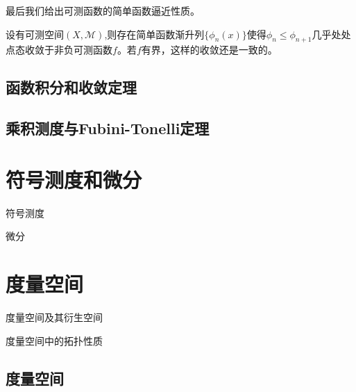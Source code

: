 \documentclass[lang=cn,10pt]{elegantbook}
\begin{document}
	最后我们给出可测函数的简单函数逼近性质。
	\begin{theorem}[可测函数的简单函数逼近]
		设有可测空间\((X,\mathcal{M})\),则存在简单函数渐升列\(\{\phi_n(x)\}\)使得\(\phi_n\le\phi_{n+1}\)几乎处处点态收敛于非负可测函数\(f\)。若\(f\)有界，这样的收敛还是一致的。
	\end{theorem}

	\section{函数积分和收敛定理}


	\section{乘积测度与Fubini-Tonelli定理}

	\chapter{符号测度和微分}
	\begin{introduction}
		\item 符号测度
		\item 微分
	\end{introduction}
	
	\chapter{度量空间}
	\begin{introduction}
		\item 度量空间及其衍生空间
		\item 度量空间中的拓扑性质
	\end{introduction}
	
	\section{度量空间}
	
\end{document}
